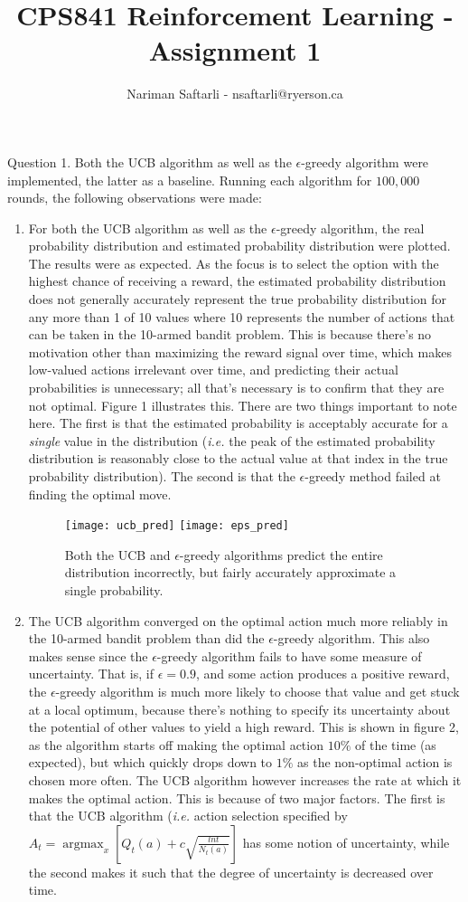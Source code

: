 \documentclass{article}
\title{CPS841 Reinforcement Learning - Assignment 1}
\author{Nariman Saftarli - nsaftarli@ryerson.ca}
\DeclareMathOperator*{\argmax}{argmax}
\begin{document}
\maketitle
\newpage

Question 1.  Both the UCB algorithm as well as the $\epsilon$-greedy algorithm were implemented, the latter as a baseline. Running each algorithm for $100,000$ rounds, the following observations were made:
	\begin{enumerate}
	\item For both the UCB algorithm as well as the $\epsilon$-greedy algorithm, the real probability distribution and estimated probability distribution were plotted. The results were as expected. As the focus is to select the option with the highest chance of receiving a reward, the estimated probability distribution does not generally accurately represent the true probability distribution for any more than 1 of 10 values where 10 represents the number of actions that can be taken in the 10-armed bandit problem. This is because there's no motivation other than maximizing the reward signal over time, which makes low-valued actions irrelevant over time, and predicting their actual probabilities is unnecessary; all that's necessary is to confirm that they are not optimal. Figure 1 illustrates this. There are two things important to note here. The first is that the estimated probability is acceptably accurate for a \textit{single} value in the distribution (\textit{i.e.} the peak of the estimated probability distribution is reasonably close to the actual value at that index in the true probability distribution). The second is that the $\epsilon$-greedy method failed at finding the optimal move.
	\begin{figure}[h]
	\centering
	\texttt{[image: ucb\_pred]}
	\texttt{[image: eps\_pred]}
	\caption{Both the UCB and $\epsilon$-greedy algorithms predict the entire distribution incorrectly, but fairly accurately approximate a single probability.}
	\end{figure}
	\item The UCB algorithm converged on the optimal action much more reliably in the 10-armed bandit problem than did the $\epsilon$-greedy algorithm. This also makes sense since the $\epsilon$-greedy algorithm fails to have some measure of uncertainty. That is, if $\epsilon=0.9$, and some action produces a positive reward, the $\epsilon$-greedy algorithm is much more likely to choose that value and get stuck at a local optimum, because there's nothing to specify its uncertainty about the potential of other values to yield a high reward. This is shown in figure 2, as the algorithm starts off making the optimal action $10\%$ of the time (as expected), but which quickly drops down to $1\%$ as the non-optimal action is chosen more often. The UCB algorithm however increases the rate at which it makes the optimal action. This is because of two major factors. The first is that the UCB algorithm (\textit{i.e.} action selection specified by $A_t = \argmax_x [Q_t(a) + c\sqrt{\frac{lnt}{N_t(a)}}]$ has some notion of uncertainty, while the second makes it such that the degree of uncertainty is decreased over time. 

\end{enumerate}
\end{document}
